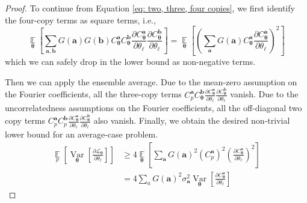\documentclass[a4paper,onecolumn,notitlepage,nofootinbib,longbibliography,superscriptaddress, floatfix, pra, aps, 10pt]{revtex4-2}
\newcommand{\vttheta}{{\bm{\theta}}}
\newcommand{\vta}{{\bm{a}}}
\newcommand{\vtb}{{\bm{b}}}
\begin{document}
\begin{proof}
To continue from Equation \ref{eq: two, three, four copies}, we first identify the four-copy terms as square terms, i.e., 
\begin{equation}
    \operatorname*{\mathbb{E}}_{\vttheta} \left[ \sum_{\vta, \vtb} G(\vta) G(\vtb) C_\vttheta^\vta C_\vttheta^\vtb \frac{\partial C_\vttheta^\vta}{\partial \theta_\ell} \frac{\partial C_\vttheta^\vtb}{\partial \theta_\ell}\right] =\operatorname*{\mathbb{E}}_{\vttheta}\left[ \left(\sum_{\vta} G(\vta) C_\vttheta^\vta \frac{\partial C_\vttheta^\vta}{\partial \theta_\ell}\right)^2\right]
\end{equation}
which we can safely drop in the lower bound as non-negative terms. 

Then we can apply the ensemble average. Due to the mean-zero assumption on the Fourier coefficients, all the three-copy terms $C^\vta_p C_\vttheta^\vtb \frac{\partial C_\vttheta^\vta}{\partial \theta_\ell} \frac{\partial C_\vttheta^\vtb}{\partial \theta_\ell}$ vanish. Due to the uncorrelatedness assumptions on the Fourier coefficients, all the off-diagonal two copy terms $C^\vta_p C^\vtb_p \frac{\partial C_\vttheta^\vta}{\partial \theta_\ell} \frac{\partial C_\vttheta^\vtb}{\partial \theta_\ell}$ also vanish. Finally, we obtain the desired non-trivial lower bound for an average-case problem.
\begin{align}
 \operatorname*{\mathbb{E}}_p\left[\operatorname*{Var}_{\vttheta} \left[ \frac{\partial \mathcal{L}_\vttheta}{\partial \theta_\ell} \right]\right] &\geq 4 \operatorname*{\mathbb{E}}_{\vttheta}  \left[ \sum_{\vta} G(\vta)^2 (C^\vta_p)^2 \left(\frac{\partial C_\vttheta^\vta}{\partial \theta_\ell}\right)^2 \right] \\
 &= 4 \sum_aG(\vta)^2\sigma_\vta^2\operatorname*{Var}_{\vttheta} \left[ \frac{\partial C^\vta_\vttheta}{\partial \theta_\ell} \right] 
\end{align}
\end{proof}
\end{document}
